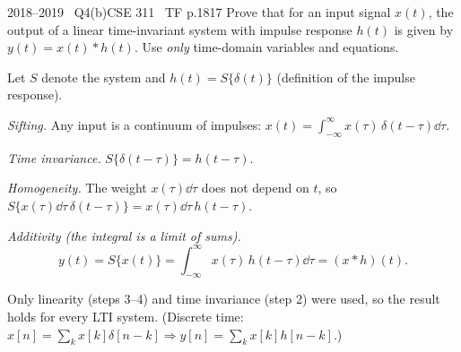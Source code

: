\begin{qcard}{2018--2019 \textbullet\ Q4(b)}{CSE 311 \textbullet\ TF p.18}{17}
Prove that for an input signal $x(t)$, the output of a linear time-invariant system with impulse response $h(t)$ is given by $y(t)=x(t)*h(t)$. Use \emph{only} time-domain variables and equations.
\end{qcard}
\begin{solution}
Let $S$ denote the system and $h(t)=S\{\delta(t)\}$ (definition of the impulse response).
\begin{steps}
\item \emph{Sifting.} Any input is a continuum of impulses: $x(t)=\displaystyle\int_{-\infty}^{\infty}x(\tau)\,\delta(t-\tau)\dd\tau$.
\item \emph{Time invariance.} $S\{\delta(t-\tau)\}=h(t-\tau)$.
\item \emph{Homogeneity.} The weight $x(\tau)\dd\tau$ does not depend on $t$, so $S\{x(\tau)\dd\tau\,\delta(t-\tau)\}=x(\tau)\dd\tau\,h(t-\tau)$.
\item \emph{Additivity (the integral is a limit of sums).}
\[y(t)=S\{x(t)\}=\int_{-\infty}^{\infty}x(\tau)\,h(t-\tau)\dd\tau=(x*h)(t).\]
\end{steps}
Only linearity (steps 3--4) and time invariance (step 2) were used, so the result holds for every LTI system. (Discrete time: $x[n]=\sum_kx[k]\delta[n-k]\Rightarrow y[n]=\sum_kx[k]h[n-k]$.)
\end{solution}
